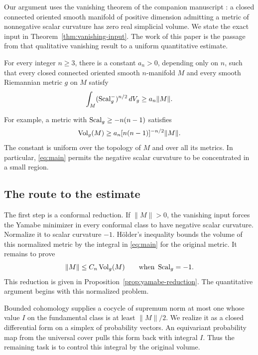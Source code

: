 Our argument uses the vanishing theorem of the companion manuscript
\cite[Corollary 1.5]{OpenAIScalarInessentiality2026}: a closed connected
oriented smooth manifold of positive dimension admitting a metric of
nonnegative scalar curvature has zero
real simplicial volume. We state the exact input in
Theorem~\ref{thm:vanishing-input}. The work of this paper is the passage from
that qualitative vanishing result to a uniform quantitative estimate.

\begin{theorem}
\label{thm:main}
For every integer \(n\ge3\), there is a constant \(a_n>0\), depending
only on \(n\), such that every closed connected oriented smooth
\(n\)-manifold \(M\) and every smooth Riemannian metric \(g\) on \(M\)
satisfy
\begin{equation}
  \int_M(\operatorname{Scal}_g^-)^{n/2}\,dV_g\ge a_n\|M\|.
  \label{eq:main}
\end{equation}
\end{theorem}

For example, a metric with \(\operatorname{Scal}_g\ge-n(n-1)\) satisfies
\[
  \operatorname{Vol}_g(M)\ge
  a_n[n(n-1)]^{-n/2}\|M\|.
\]
The constant is uniform over the topology of \(M\) and over all its
metrics. In particular, \eqref{eq:main} permits the negative scalar
curvature to be concentrated in a small region.

\subsection*{The route to the estimate}

The first step is a conformal reduction. If \(\|M\|>0\), the vanishing
input forces the Yamabe minimizer in every conformal class to have
negative scalar curvature. Normalize it to scalar curvature \(-1\).
H\"older's inequality bounds the volume of this normalized metric by
the integral in \eqref{eq:main} for the original metric. It remains
to prove
\[
  \|M\|\le C_n\operatorname{Vol}_g(M)\qquad\text{when }\operatorname{Scal}_g=-1.
\]
This reduction is given in Proposition~\ref{prop:yamabe-reduction}. The
quantitative argument begins with this normalized problem.

Bounded cohomology supplies a cocycle of supremum norm at most one
whose value \(I\) on the fundamental class is at least
\(\|M\|/2\). We realize it as a closed differential form on a simplex
of probability vectors. An equivariant probability map from the
universal cover pulls this form back with integral \(I\). Thus the
remaining task is to control this integral by the original volume.

